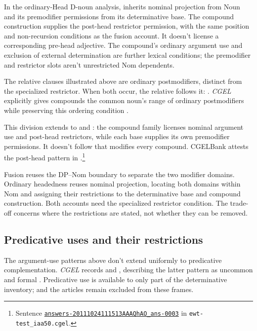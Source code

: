 \documentclass[12pt]{article}
\begin{document}
In the ordinary-Head D-noun analysis,  inherits nominal projection from Noun and its premodifier permissions from its determinative base. The compound construction supplies the post-head restrictor permission, with the same position and non-recursion conditions as the fusion account. It doesn't license a corresponding pre-head adjective. The compound's ordinary argument use and exclusion of external determination are further lexical conditions; the premodifier and restrictor slots aren't unrestricted Nom dependents.

The relative clauses illustrated above are ordinary postmodifiers, distinct from the specialized restrictor. When both occur, the relative follows it: . \textit{CGEL} explicitly gives compounds the common noun's range of ordinary postmodifiers while preserving this ordering condition \citep[423]{huddleston2002}.

This division extends to  and : the compound family licenses nominal argument use and post-head restrictors, while each base supplies its own premodifier permissions. It doesn't follow that  modifies every compound. CGELBank attests the post-head pattern in .\footnote{Sentence \href{https://github.com/nert-nlp/cgel/blob/d0a2c2d8c522b23d5aa879fc9cb94948f4285b2c/datasets/ewt-test_iaa50.cgel\#L179-L181}{\nolinkurl{answers-20111024111513AAAQhAO_ans-0003}} in \nolinkurl{ewt-test_iaa50.cgel}.}

Fusion reuses the DP--Nom boundary to separate the two modifier domains. Ordinary headedness reuses nominal projection, locating both domains within Nom and assigning their restrictions to the determinative base and compound construction. Both accounts need the specialized restrictor condition. The trade-off concerns where the restrictions are stated, not whether they can be removed.

\subsection{Predicative uses and their restrictions}\label{sec:predication}

The argument-use patterns above don't extend uniformly to predicative complementation. \textit{CGEL} records  and , describing the latter pattern as uncommon and formal \citep[392, 395--396]{huddleston2002}. Predicative use is available to only part of the determinative inventory;  and the articles remain excluded from these frames.
\end{document}
